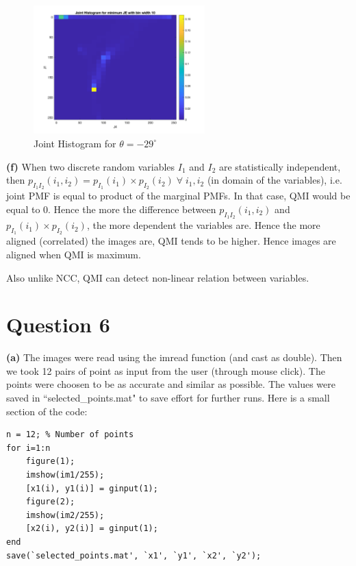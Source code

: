 \documentclass[12pt]{article}
\begin{document}
    \vspace{-13pt}
    
    \begin{figure}[H]
        \centering
        \includegraphics[width=0.59\textwidth]{Images/Q5/Joint_hist_JE.png}
        \vspace{-10pt}
        \caption{Joint Histogram for $\theta = -29^{\circ}$}
    \end{figure}
    
    \vspace{-10pt}

    \textbf{(f)} When two discrete random variables $I_1$ and $I_2$ are statistically independent, then $p_{I_1 I_2}(i_1,i_2)=p_{I_1}(i_1) \times p_{I_2}(i_2) \; \forall \; i_1, i_2$ (in domain of the variables), i.e. joint PMF is equal to product of the marginal PMFs. In that case, QMI would be equal to $0$. Hence the more the difference between $p_{I_1 I_2}(i_1,i_2)$ and $p_{I_1}(i_1) \times p_{I_2}(i_2)$, the more dependent the variables are. Hence the more aligned (correlated) the images are, QMI tends to be higher. Hence images are aligned when QMI is maximum.
    
    Also unlike NCC, QMI can detect non-linear relation between variables.
\clearpage
\section*{Question 6}
\textbf{(a)} The images were read using the imread function (and cast as double). Then we took 12 pairs of point as input from the user (through mouse click). The points were choosen to be as accurate and similar as possible. The values were saved in ``selected\_points.mat" to save effort for further runs. Here is a small section of the code:
\begin{verbatim}
n = 12; % Number of points
for i=1:n
    figure(1); 
    imshow(im1/255); 
    [x1(i), y1(i)] = ginput(1);
    figure(2); 
    imshow(im2/255); 
    [x2(i), y2(i)] = ginput(1);
end
save(`selected_points.mat', `x1', `y1', `x2', `y2');
\end{verbatim}
\end{document}
